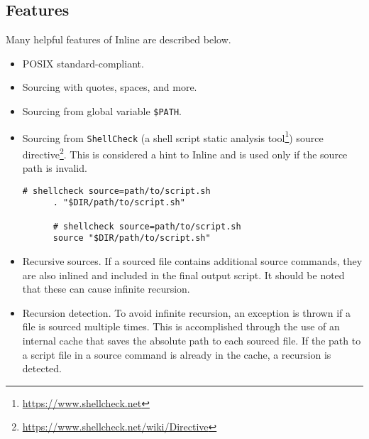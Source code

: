 \subsection{Features}
\label{subsec:corollary_projects_inline_features}

Many helpful features of Inline are described below.

\begin{itemize}
  \item POSIX standard-compliant.

  \item Sourcing with quotes, spaces, and more.

  \item Sourcing from global variable \texttt{\$PATH}.

  \item Sourcing from \texttt{ShellCheck} (a shell script static analysis tool\footnote{\url{https://www.shellcheck.net}})
    source directive\footnote{\url{https://www.shellcheck.net/wiki/Directive}}.
    \newline
    This is considered a hint to Inline and is used only if the source path is invalid.
    \newline
    \begin{lstlisting}[language=shell, alsoletter={.}, morekeywords={[2]{.}}, numbers=none, aboveskip=0pt, belowskip=0pt, abovecaptionskip=0pt, belowcaptionskip=0pt]
      # shellcheck source=path/to/script.sh
      . "$DIR/path/to/script.sh"

      # shellcheck source=path/to/script.sh
      source "$DIR/path/to/script.sh"
    \end{lstlisting}

  \item Recursive sources. If a sourced file contains additional source commands,
    they are also inlined and included in the final output script.
    \newline
    It should be noted that these can cause infinite recursion.

  \item Recursion detection. To avoid infinite recursion, an exception is thrown
    if a file is sourced multiple times. This is accomplished through the use of
    an internal cache that saves the absolute path to each sourced file. If the path
    to a script file in a source command is already in the cache, a recursion is
    detected.


\end{itemize}
